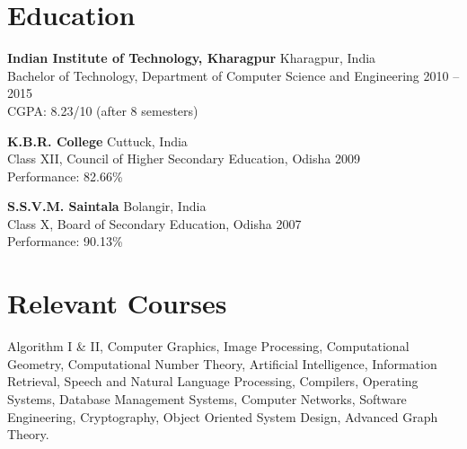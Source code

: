 \documentclass[hidelinks,margin,line,10pt,a4paper]{resume}
\begin{document}
\begin{resume}

\section{\mysidestyle Education}
\begin{list2}

            \item \textbf{Indian Institute of Technology, Kharagpur} \hfill Kharagpur, India \vspace{0mm}\\\vspace{1mm}%
    		Bachelor of Technology, Department of Computer Science and Engineering \hfill 2010 -- 2015  \vspace{-1mm}\\\vspace{1mm}%
		CGPA: 8.23/10 {(after 8 semesters)}
		 
             \item \textbf{K.B.R. College } \hfill Cuttuck, India \vspace{0mm}\\\vspace{1mm}%
    		{Class XII, Council of Higher Secondary Education, Odisha } \hfill { 2009}  \vspace{-1mm}\\\vspace{1mm}%
		{Performance: 82.66\%}
		
			\item \textbf{S.S.V.M. Saintala} \hfill Bolangir, India \vspace{0mm}\\\vspace{1mm}%
    		{Class X, Board of Secondary Education, Odisha } \hfill { 2007 }  \vspace{-1mm}\\\vspace{1mm}%
		{Performance: 90.13\%}
% 


\end{list2}



    \section{\mysidestyle Relevant Courses} 
Algorithm I \& II, Computer Graphics, Image Processing, Computational Geometry, Computational Number Theory, Artificial Intelligence, Information Retrieval, Speech and Natural Language Processing, Compilers, Operating Systems, Database Management Systems, Computer Networks, Software Engineering, Cryptography, Object Oriented System Design, Advanced Graph Theory.


\end{resume}
\end{document}
